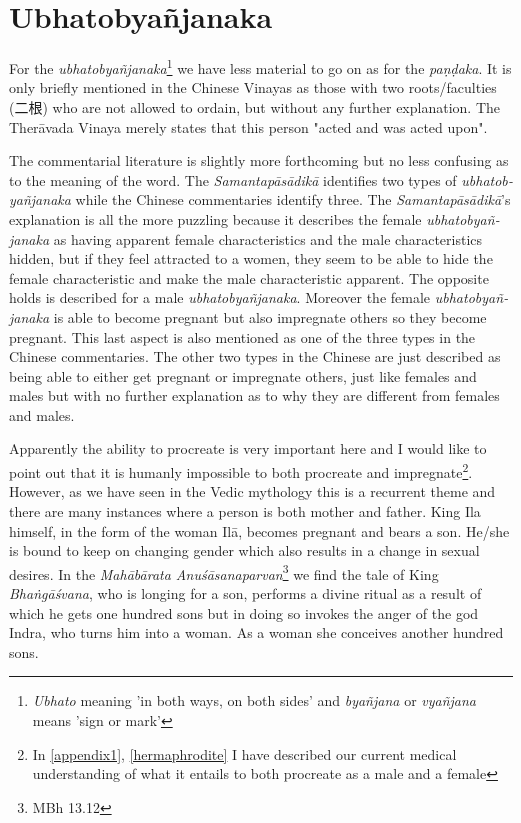 \section{Ubhatob­yañ­janaka}

For the {\em ubhatob­yañ­janaka}\footnote{{\em Ubhato} meaning 'in both ways, on both sides' and {\em byañjana} or {\em vyañjana} means 'sign or mark'} we have less material to go on as for the {\em paṇḍaka}. It is only briefly mentioned in the Chinese Vinayas as those with two roots/faculties (二根) who are not allowed to ordain, but without any further explanation. The Therāvada Vinaya merely states that this person "acted and was acted upon". 

The commentarial literature is slightly more forthcoming but no less confusing as to the meaning of the word. The {\em Samantapāsādikā} identifies two types of {\em ubhatob­yañ­janaka} while the Chinese commentaries identify three. The {\em Samantapāsādikā}'s explanation is all the more puzzling because it describes the female {\em ubhatob­yañ­janaka} as having apparent female characteristics and the male characteristics hidden, but if they feel attracted to a women, they seem to be able to hide the female characteristic and make the male characteristic apparent. The opposite holds is described for a male {\em ubhatob­yañ­janaka}. Moreover the female {\em ubhatob­yañ­janaka} is able to become pregnant but also impregnate others so they become pregnant. This last aspect is also mentioned as one of the three types in the Chinese commentaries. The other two types in the Chinese are just described as being able to either get pregnant or impregnate others, just like females and males but with no further explanation as to why they are different from females and males. 

Apparently the ability to procreate is very important here and I would like to point out that it is humanly impossible to both procreate and impregnate\footnote{In \ref{appendix1}, \ref{hermaphrodite} I have described our current medical understanding of what it entails to both procreate as a male and a female}. However, as we have seen in the Vedic mythology this is a recurrent theme and there are many instances where a person is both mother and father. King Ila himself, in the form of the woman Ilā, becomes pregnant and bears a son. He/she is bound to keep on changing gender which also results in a change in sexual desires. In the {\em Mahābārata Anuśāsanaparvan}\footnote{MBh 13.12} we find the tale of King {\em Bhaṅgāśvana}, who is longing for a son, performs a divine ritual as a result of which he gets one hundred sons but in doing so invokes the anger of the god Indra, who turns him into a woman. As a woman she conceives another hundred sons.

